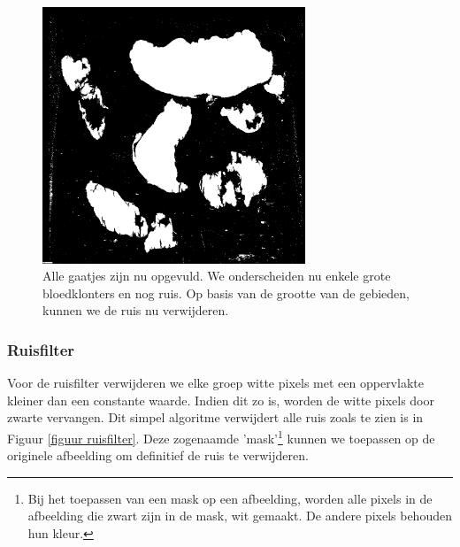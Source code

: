 \documentclass[a4paper,kulak]{kulakarticle}
\begin{document}
	\begin{figure}[H]
		\centering
		\includegraphics[width = 0.7\textwidth]{grijswaarden_bin_gevuld_vb}
		\caption{Alle gaatjes zijn nu opgevuld. We onderscheiden nu enkele grote bloedklonters en nog ruis. Op basis van de grootte van de gebieden, kunnen we de ruis nu verwijderen.}
		\label{figuur lok_bloed}
	\end{figure}

	\subsubsection{Ruisfilter}
		Voor de ruisfilter verwijderen we elke groep witte pixels met een oppervlakte kleiner dan een constante waarde. Indien dit zo is, worden de witte pixels door zwarte vervangen. Dit simpel algoritme verwijdert alle ruis zoals te zien is in Figuur \ref{figuur ruisfilter}. Deze zogenaamde 'mask'\footnote{Bij het toepassen van een mask op een afbeelding, worden alle pixels in de afbeelding die zwart zijn in de mask, wit gemaakt. De andere pixels behouden hun kleur.} kunnen we toepassen op de originele afbeelding om definitief de ruis te verwijderen.
\end{document}
